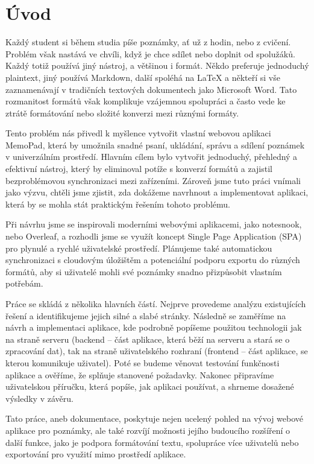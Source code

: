 \section{Úvod}

Každý student si během studia píše poznámky, ať už z hodin, nebo z cvičení.
Problém však nastává ve chvíli, když je chce sdílet nebo doplnit od spolužáků.
Každý totiž používá jiný nástroj, a většinou i formát. Někdo preferuje
jednoduchý plaintext, jiný používá Markdown, další spoléhá na LaTeX a někteří
si vše zaznamenávají v tradičních textových dokumentech jako Microsoft Word.
Tato rozmanitost formátů však komplikuje vzájemnou spolupráci a často vede ke
ztrátě formátování nebo složité konverzi mezi různými formáty.

Tento problém nás přivedl k myšlence vytvořit vlastní webovou aplikaci MemoPad,
která by umožnila snadné psaní, ukládání, správu a sdílení poznámek v
univerzálním prostředí. Hlavním cílem bylo vytvořit jednoduchý, přehledný a
efektivní nástroj, který by eliminoval potíže s konverzí formátů a zajistil
bezproblémovou synchronizaci mezi zařízeními. Zároveň jsme tuto práci vnímali
jako výzvu, chtěli jsme zjistit, zda dokážeme navrhnout a implementovat
aplikaci, která by se mohla stát praktickým řešením tohoto problému.

Při návrhu jsme se inspirovali moderními webovými aplikacemi, jako notesnook,
nebo Overleaf, a rozhodli jsme se využít koncept Single Page Application (SPA)
pro plynulé a rychlé uživatelské prostředí. Plánujeme také automatickou
synchronizaci s cloudovým úložištěm a potenciální podporu exportu do různých
formátů, aby si uživatelé mohli své poznámky snadno přizpůsobit vlastním
potřebám.

Práce se skládá z několika hlavních částí. Nejprve provedeme analýzu
existujících řešení a identifikujeme jejich silné a slabé stránky. Následně se
zaměříme na návrh a implementaci aplikace, kde podrobně popíšeme použitou
technologii jak na straně serveru (backend -- část aplikace, která běží na
serveru a stará se o zpracování dat), tak na straně uživatelského rozhraní
(frontend -- část aplikace, se kterou komunikuje uživatel). Poté se budeme
věnovat testování funkčnosti aplikace a ověříme, že splňuje stanovené
požadavky. Nakonec připravíme uživatelskou příručku, která popíše, jak aplikaci
používat, a shrneme dosažené výsledky v závěru.

Tato práce, aneb dokumentace, poskytuje nejen ucelený pohled na vývoj webové
aplikace pro poznámky, ale také rozvíjí možnosti jejího budoucího rozšíření o
další funkce, jako je podpora formátování textu, spolupráce více uživatelů nebo
exportování pro využití mimo prostředí aplikace.
